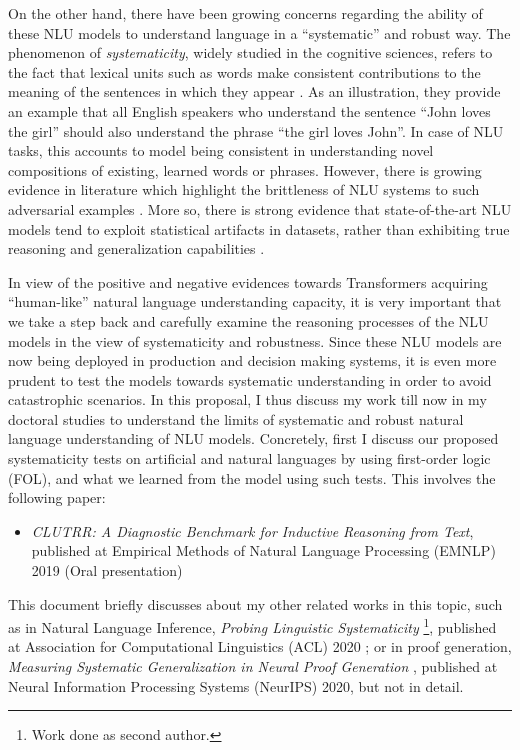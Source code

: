 \documentclass[12pt]{article}
\begin{document}
On the other hand, there have been growing concerns regarding the ability of these NLU models to understand language in a ``systematic'' and robust way. The phenomenon of \textit{systematicity}, widely studied in the cognitive sciences, refers to the fact that lexical units such as words make consistent contributions to the meaning of the sentences in which they appear \cite{fodor1988connectionism}. As an illustration, they provide an example that all English speakers who understand the sentence ``John loves the girl'' should also understand the phrase ``the girl loves John''. In case of NLU tasks, this accounts to model being consistent in understanding novel compositions of existing, learned words or phrases. However, there is growing evidence in literature which highlight the brittleness of NLU systems to such adversarial examples \cite{jia2016,jin2020bert}. More so, there is strong evidence that state-of-the-art NLU models tend to exploit statistical artifacts in datasets, rather than exhibiting true reasoning and generalization capabilities \cite{gururangan2018a,poliak-etal-2018-hypothesis,tsuchiya-2018-performance,naik-etal-2018-stress,mccoy2019}.

In view of the positive and negative evidences towards Transformers acquiring ``human-like'' natural language understanding capacity, it is very important that we take a step back and carefully examine the reasoning processes of the NLU models in the view of systematicity and robustness. Since these NLU models are now being deployed in production and decision making systems, it is even more prudent to test the models towards systematic understanding in order to avoid catastrophic scenarios. In this proposal, I thus discuss my work till now in my doctoral studies to understand the limits of systematic and robust natural language understanding of NLU models. Concretely, first I discuss our proposed systematicity tests on artificial and natural languages by using first-order logic (FOL), and what we learned from the model using such tests. This involves the following paper:

\begin{itemize}
  \item \textit{CLUTRR: A Diagnostic Benchmark for Inductive Reasoning from Text}, published at Empirical Methods of Natural Language Processing (EMNLP) 2019 (Oral presentation) \cite{sinha2019a}
\end{itemize}

This document briefly discusses about my other related works in this topic, such as in Natural Language Inference, \textit{Probing Linguistic Systematicity} \footnote{Work done as second author.}, published at Association for Computational Linguistics (ACL) 2020 \cite{goodwin2020}; or in proof generation, \textit{Measuring Systematic Generalization in Neural Proof Generation} \cite{gontier2020}, published at Neural Information Processing Systems (NeurIPS) 2020, but not in detail.
\end{document}
